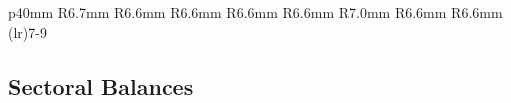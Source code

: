 \begin{minipage}{0.76\textwidth}
 \setlength{\tabcolsep}{4.5pt} \color{black!90}
		{\renewcommand{\arraystretch}{1.65}
\hspace*{-1mm} \begin{tabular}{p{40mm} R{6.7mm} R{6.6mm} R{6.6mm} R{6.6mm} R{6.6mm}
		    R{7.0mm} R{6.6mm} R{6.6mm} }
		    \cmidrule(lr){7-9}
		  \addlinespace[-1mm]
			  \hline
		\end{tabular}}\vspace{-1.5mm}
		
\end{minipage}
\newpage
\hypertarget{ofsb}{\label{ofsb}}
\subsection*{Sectoral Balances}
